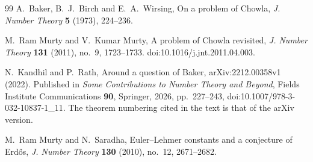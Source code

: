 \documentclass[11pt,a4paper]{article}
\theoremstyle{definition}
\theoremstyle{remark}
\begin{document}
\begin{thebibliography}{99}
A.~Baker, B.~J.~Birch and E.~A.~Wirsing,
On a problem of Chowla,
\emph{J. Number Theory} \textbf{5} (1973), 224--236.

M.~Ram Murty and V.~Kumar Murty,
A problem of Chowla revisited,
\emph{J. Number Theory} \textbf{131} (2011), no.~9, 1723--1733.
doi:10.1016/j.jnt.2011.04.003.

N.~Kandhil and P.~Rath,
Around a question of Baker,
arXiv:2212.00358v1 (2022).
Published in \emph{Some Contributions to Number Theory and Beyond},
Fields Institute Communications \textbf{90}, Springer, 2026,
pp.~227--243, doi:10.1007/978-3-032-10837-1\_11.
The theorem numbering cited in the text is that of the arXiv version.

M.~Ram Murty and N.~Saradha,
Euler--Lehmer constants and a conjecture of Erd\H{o}s,
\emph{J. Number Theory} \textbf{130} (2010), no.~12, 2671--2682.

\end{thebibliography}
\end{document}
